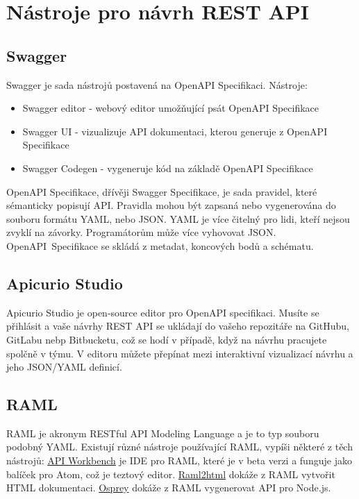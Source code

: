 \documentclass[thesis=B,czech]{FITthesis}[2012/06/26]
\begin{document}
    \section{Nástroje pro návrh REST API}
        \subsection{Swagger}
            Swagger je sada nástrojů postavená na OpenAPI Specifikaci.
            \newline Nástroje:
            \begin{itemize}
                \item Swagger editor - webový editor umožňující psát OpenAPI Specifikace
                \item Swagger UI - vizualizuje API dokumentaci, kterou generuje z OpenAPI Specifikace
                \item Swagger Codegen - vygeneruje kód na základě OpenAPI Specifikace
            \end{itemize}
            OpenAPI Specifikace, dřívěji Swagger Specifikace, je sada pravidel, které sémanticky popisují API. Pravidla mohou být zapsaná nebo vygenerována do souboru formátu YAML, nebo JSON. YAML je více čitelný pro lidi, kteří nejsou zvyklí na závorky. Programátorům může více vyhovovat JSON. OpenAPI~Specifikace se skládá z metadat, koncových bodů a schématu.
        \subsection{Apicurio Studio}
            Apicurio Studio je open-source editor pro OpenAPI specifikaci. Musíte se přihlásit a vaše návrhy REST API se ukládají do vašeho repozitáře na GitHubu, GitLabu nebp Bitbucketu, což se hodí v případě, když na návrhu pracujete spolčně v týmu. V editoru můžete přepínat mezi interaktivní vizualizací návrhu a jeho JSON/YAML definicí.
        \subsection{RAML}
            RAML je akronym RESTful API Modeling Language a je to typ souboru podobný YAML. Existují různé nástroje používající RAML, vypíši některé z těch nástrojů:
            \href{http://apiworkbench.com}{API Workbench} je IDE pro RAML, které je v beta verzi a funguje jako balíček pro Atom, což je teztový editor.
            \href{https://github.com/raml2html/raml2html}{Raml2html} dokáže z RAML vytvořit  HTML dokumentaci.
            \href{https://github.com/mulesoft/osprey}{Osprey} dokáže z RAML vygenerovat API pro Node.js.
\end{document}
